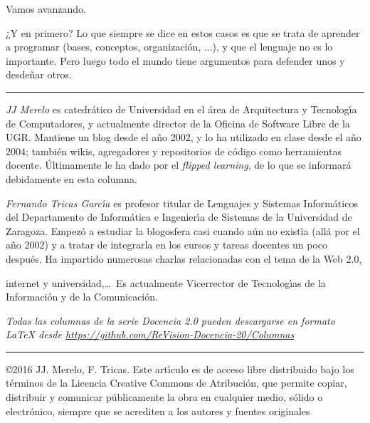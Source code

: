 \documentclass[twoside,10pt]{article}
\newcommand{\surl}[1]{{\small\url{#1}}}
\newcounter{num}
\begin{document}
\begin{multicols}{2}
Vamos avanzando.

¿Y en primero? 
Lo que siempre se dice en estos casos es que se trata de aprender a
programar (bases, conceptos, organización, ...), y que el lenguaje no es lo
importante. Pero luego todo el mundo tiene argumentos para defender unos
y desdeñar otros.
\noindent\rule{86mm}{1pt}
\vspace{1ex} {\small{\begin{window} 
\noindent\emph{JJ Merelo} es catedr\'{a}tico de Universidad
en el \'area de Arquitectura y Tecnolog\'{\i}a de Computadores, y
actualmente director de la Oficina de Software Libre de la UGR.
Mantiene un blog desde el a\~no 2002, y lo ha utilizado en clase desde
el a\~no 2004; tambi\'en wikis, agregadores y repositorios de c\'odigo
como herramientas docente. \'{U}ltimamente le ha dado por el \textsl{flipped
learning}, de lo que se informar\'{a} debidamente en esta columna.
\end{window}}}

\medskip

{\small{\begin{window}
		\noindent \emph{Fernando Tricas Garc\'{\i}a} es profesor
		titular de Lenguajes y Sistemas Inform\'{a}ticos del Departamento
		de Inform\'{a}tica e Ingenier\'{\i}a de Sistemas de la Universidad de
		Zaragoza.  Empez\'{o} a estudiar la blogosfera casi cuando a\'{u}n no
		exist\'{\i}a (all\'{a} por el a\~{n}o 2002) y a tratar de integrarla en los
		cursos y tareas docentes un poco despu\'{e}s.  Ha impartido
		numerosas charlas relacionadas con el tema de la Web 2.0, 

		internet y universidad,\ldots\ 
		Es actualmente Vicerrector de Tecnolog\'{\i}as de la Informaci\'{o}n y
de la Comunicaci\'{o}n.   
		\end{window}}}


\noindent  
\bigskip

\noindent\emph{Todas las columnas de la serie Docencia 2.0
pueden descargarse en formato LaTeX desde
\surl{https://github.com/ReVision-Docencia-20/Columnas}}

\noindent\rule{90mm}{1pt}

{\small \noindent\copyright 2016 JJ. Merelo, F. Tricas. Este art\'{\i}culo es de acceso libre distribuido bajo los t\'{e}rminos
de la Licencia Creative Commons de Atribuci\'{o}n, que permite copiar,
distribuir y comunicar p\'{u}blicamente la obra en cualquier medio, s\'{o}lido
o electr\'{o}nico, siempre que se acrediten a los autores y fuentes
originales}

\end{multicols}
\end{document}

